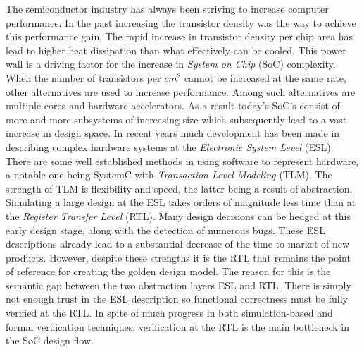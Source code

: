 The semiconductor industry has always been striving to increase computer performance. In the past increasing the transistor density was the way to achieve this performance gain. The rapid increase in transistor density per chip area has lead to higher heat dissipation than what effectively can be cooled. This power wall is a driving factor for the increase in \textit{System on Chip} (SoC) complexity. When the number of transistors per $cm^2$ cannot be increased at the same rate, other alternatives are used to increase performance. Among such alternatives are multiple cores and hardware accelerators. As a result today's SoC's consist of more and more subsystems of increasing size which subsequently lead to a vast increase in design space. In recent years much development has been made in describing complex hardware systems at the \textit{Electronic System Level} (ESL). There are some well established methods in using software to represent hardware, a notable one being SystemC with \textit{Transaction Level Modeling} (TLM). The strength of TLM is flexibility and speed, the latter being a result of abstraction. Simulating a large design at the ESL takes orders of magnitude less time than at the \textit{Register Transfer Level} (RTL). Many design decisions can be hedged at this early design stage, along with the detection of numerous bugs. These ESL descriptions already lead to a substantial decrease of the time to market of new products. However, despite these strengths it is the RTL that remains the point of reference for creating the golden design model. The reason for this is the semantic gap between the two abstraction layers ESL and RTL. There is simply not enough trust in the ESL description so functional correctness must be fully verified at the RTL. In spite of much progress in both simulation-based and formal verification techniques, verification at the RTL is the main bottleneck in the SoC design flow. \par

